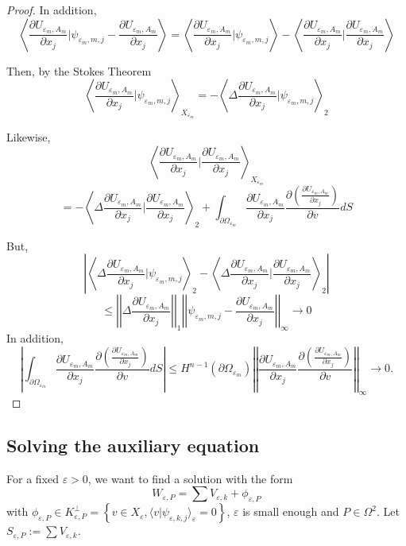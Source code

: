 \documentclass[12pt]{amsart}
\theoremstyle{plain}
\theoremstyle{definition}
\theoremstyle{remark}
\renewcommand{\epsilon}{\varepsilon}
\begin{document}
\begin{proof}
In addition, 
$$\left\langle\frac{\partial U_{\epsilon_m,A_m}}{\partial x_j}|\psi_{\epsilon_m,m,j}-\frac{\partial U_{\epsilon_m,A_m}}{\partial x_j} \right\rangle=\left\langle\frac{\partial U_{\epsilon_m,A_m}}{\partial x_j}|\psi_{\epsilon_m,m,j}\right\rangle-\left\langle\frac{\partial U_{\epsilon_m,A_m}}{\partial x_j}|\frac{\partial U_{\epsilon_m,A_m}}{\partial x_j} \right\rangle$$

Then, by the Stokes Theorem
$$\left\langle\frac{\partial U_{\epsilon_m,A_m}}{\partial x_j}|\psi_{\epsilon_m,m,j}\right\rangle_{X_{\epsilon_m}}=-\left\langle\Delta\frac{\partial U_{\epsilon_m,A_m}}{\partial x_j}|\psi_{\epsilon_m,m,j}\right\rangle_2$$


Likewise, 
$$\left\langle\frac{\partial U_{\epsilon_m,A_m}}{\partial x_j}|\frac{\partial U_{\epsilon_m,A_m}}{\partial x_j} \right\rangle_{X_{\epsilon_m}}$$
$$=-\left\langle \Delta\frac{\partial U_{\epsilon_m,A_m}}{\partial x_j}|\frac{\partial U_{\epsilon_m,A_m}}{\partial x_j} \right\rangle_2+\int_{\partial\Omega_{\epsilon_m}}\frac{\partial U_{\epsilon_m,A_m}}{\partial x_j} \frac{\partial (\frac{\partial U_{\epsilon_m,A_m}}{\partial x_j})}{\partial v}dS $$

But, 
$$\left|\left\langle\Delta\frac{\partial U_{\epsilon_m,A_m}}{\partial x_j}|\psi_{\epsilon_m,m,j}\right\rangle_2-\left\langle \Delta\frac{\partial U_{\epsilon_m,A_m}}{\partial x_j}|\frac{\partial U_{\epsilon_m,A_m}}{\partial x_j} \right\rangle_2\right|$$
$$\leq \left|\left|\Delta\frac{\partial U_{\epsilon_m,A_m}}{\partial x_j}\right|\right|_1\left|\left|\psi_{\epsilon_m,m,j}-\frac{\partial U_{\epsilon_m,A_m}}{\partial x_j}\right|\right|_{\infty}\rightarrow0$$
In addition, 
$$\left|\int_{\partial\Omega_{\epsilon_m}}\frac{\partial U_{\epsilon_m,A_m}}{\partial x_j} \frac{\partial(\frac{\partial U_{\epsilon_m,A_m}}{\partial x_j})}{\partial v}dS\right|\leq H^{n-1}(\partial\Omega_{\epsilon_m})\left|\left|\frac{\partial U_{\epsilon_m,A_m}}{\partial x_j} \frac{\partial(\frac{\partial U_{\epsilon_m,A_m}}{\partial x_j})}{\partial v}\right|\right|_\infty \rightarrow0. $$
\end{proof}
\subsection{Solving the auxiliary equation}
For a fixed $\epsilon > 0$, we want to find a solution with the form $$W_{\epsilon,P}=  \sum V_{\epsilon,k} + \phi_{\epsilon,P} $$ with $\phi_{\epsilon,P}\in K_{\epsilon,P}^\perp =\left\{v \in X_\epsilon, \langle v|\psi_{\epsilon,k,j}\rangle_{\epsilon}=0\right \}$, $\epsilon$ is small enough and  $P \in \Omega^2$. Let $S_{\epsilon,P}:=\sum V_{\epsilon,k}$.
\end{document}
